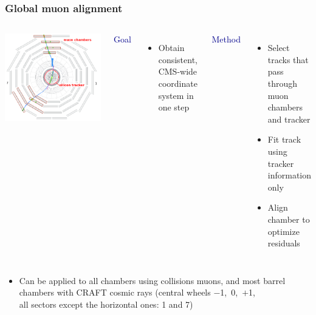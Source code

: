 \documentclass[compress]{beamer}
\begin{document}
\begin{frame}
\frametitle{Global muon alignment}

\vspace{0.5 cm}
\begin{columns}
\includegraphics[width=\linewidth]{event_display.png}

\hspace{-0.4 cm} \textcolor{darkblue}{\large Goal}
\begin{itemize}
\item Obtain consistent, CMS-wide coordinate system in one step
\end{itemize}

\vspace{0.2 cm}
\hspace{-0.4 cm} \textcolor{darkblue}{\large Method}

\begin{itemize}
\item Select tracks that pass through muon chambers and tracker
\item Fit track using tracker information only
\item Align chamber to optimize residuals
\end{itemize}
\end{columns}

\vspace{0.25 cm}
\begin{itemize}
\item Can be applied to all chambers using collisions muons, and most barrel chambers with CRAFT cosmic rays (central wheels \mbox{$-$1, 0, $+$1,\hspace{-0.5 cm}} \\ all sectors except the horizontal ones: 1 and 7)
\end{itemize}
\end{frame}
\end{document}
